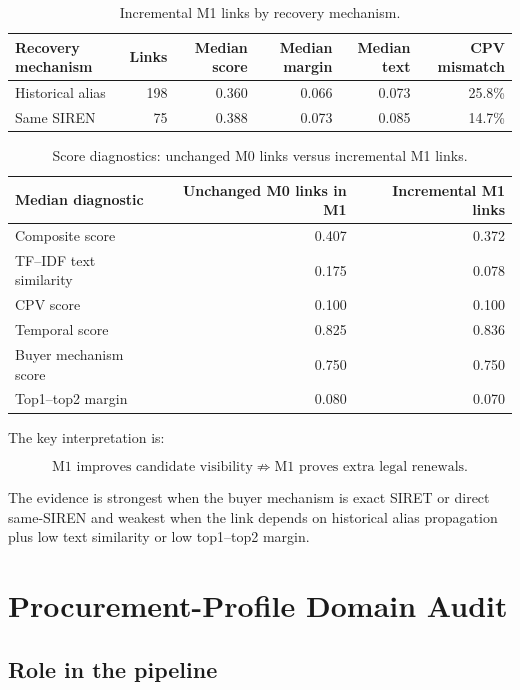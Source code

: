 \documentclass[11pt]{article}
\begin{document}
\begin{table}[h]
\centering
\caption{Incremental M1 links by recovery mechanism.}
\small
\begin{tabular}{lrrrrr}
\toprule
Recovery mechanism & Links & Median score & Median margin & Median text & CPV mismatch\\
\midrule
Historical alias & 198 & 0.360 & 0.066 & 0.073 & 25.8\%\\
Same SIREN & 75 & 0.388 & 0.073 & 0.085 & 14.7\%\\
\bottomrule
\end{tabular}
\normalsize
\end{table}

\begin{table}[h]
\centering
\caption{Score diagnostics: unchanged M0 links versus incremental M1 links.}
\begin{tabular}{lrr}
\toprule
Median diagnostic & Unchanged M0 links in M1 & Incremental M1 links\\
\midrule
Composite score & 0.407 & 0.372\\
TF--IDF text similarity & 0.175 & 0.078\\
CPV score & 0.100 & 0.100\\
Temporal score & 0.825 & 0.836\\
Buyer mechanism score & 0.750 & 0.750\\
Top1--top2 margin & 0.080 & 0.070\\
\bottomrule
\end{tabular}
\end{table}

The key interpretation is:

\[
\text{M1 improves candidate visibility}
\;\not\Rightarrow\;
\text{M1 proves extra legal renewals.}
\]

The evidence is strongest when the buyer mechanism is exact SIRET or direct
same-SIREN and weakest when the link depends on historical alias
propagation plus low text similarity or low top1--top2 margin.

\section{Procurement-Profile Domain Audit}
\label{sec:profile}

\subsection{Role in the pipeline}
\end{document}

